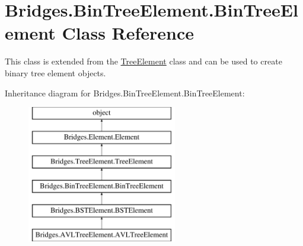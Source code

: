 \hypertarget{class_bridges_1_1_bin_tree_element_1_1_bin_tree_element}{}\section{Bridges.\+Bin\+Tree\+Element.\+Bin\+Tree\+Element Class Reference}
\label{class_bridges_1_1_bin_tree_element_1_1_bin_tree_element}


This class is extended from the \hyperlink{namespace_bridges_1_1_tree_element}{Tree\+Element} class and can be used to create binary tree element objects.  


Inheritance diagram for Bridges.\+Bin\+Tree\+Element.\+Bin\+Tree\+Element\+:\begin{figure}[H]
\begin{center}
\leavevmode
\includegraphics[height=6.000000cm]{class_bridges_1_1_bin_tree_element_1_1_bin_tree_element}
\end{center}
\end{figure}
